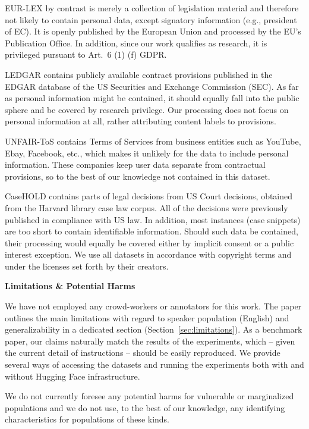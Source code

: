 \documentclass[11pt]{article}
\begin{document}
EUR-LEX by contrast is merely a collection of legislation material and therefore not likely to contain personal data, except signatory information (e.g., president of EC). It is openly published by the European Union and processed by the EU’s Publication Office. In addition, since our work qualifies as research, it is privileged pursuant to Art.\ 6 (1) (f) GDPR. 

LEDGAR contains publicly available contract provisions published in the EDGAR database of the US Securities and Exchange Commission (SEC). As far as personal information might be contained, it should equally fall into the public sphere and be covered by research privilege. Our processing does not focus on personal information at all, rather attributing content labels to provisions. 

UNFAIR-ToS contains Terms of Services from business entities such as YouTube, Ebay, Facebook, etc., which makes it unlikely for the data to include personal information. These companies keep user data separate from contractual provisions, so  to the best of our knowledge not contained in this dataset. 

CaseHOLD contains parts of legal decisions from US Court decisions, obtained from the Harvard library case law corpus. All of the decisions were previously published in compliance with US law. In addition, most instances (case snippets) are too short to contain identifiable information. Should such data be contained, their processing would equally be covered either by implicit consent or a public interest exception.
We use all datasets in accordance with copyright terms and under the licenses set forth by their creators. \vspace{2mm}

\noindent\textbf{Limitations \& Potential Harms}\vspace{1mm}

\noindent We have not employed any crowd-workers or annotators for this work. The paper outlines the main limitations with regard to speaker population (English) and generalizability in a dedicated section (Section~\ref{sec:limitations}). As a benchmark paper, our claims naturally match the results of the experiments, which – given the current detail of instructions – should be easily reproduced. We provide several ways of accessing the datasets and running the experiments both with and without Hugging Face infrastructure. 

We do not currently foresee any potential harms for vulnerable or marginalized populations and we do not use, to the best of our knowledge, any identifying characteristics for populations of these kinds. 
\end{document}
